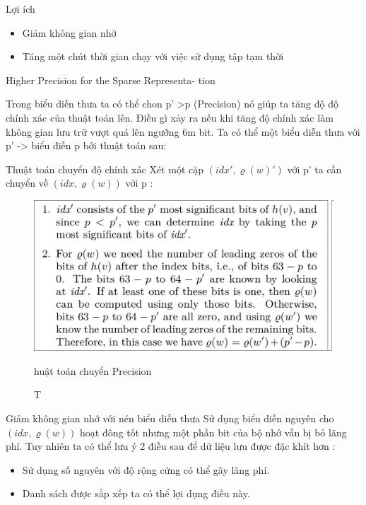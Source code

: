 \documentclass{beamer}
\begin{document}
\begin{frame}{Lợi ích }
\begin{itemize}
\item Giảm không gian nhớ
\item Tăng một chút thời gian chạy với việc sử dụng tập tạm thời
\end{itemize}
\end{frame}
\begin{frame}{Higher Precision for the Sparse Representa-
tion} 

Trong biểu diễn thưa ta có thể chon p' >p (Precision) nó giúp ta tăng độ  độ chính xác của thuật toán lên.
Điều gì xảy ra nếu khi tăng độ chính xác làm không gian lưu trữ vượt quá lên ngưỡng 6m bit.
Ta có thể một biểu diễn thưa với p' -> biểu điễn p bới thuật toán sau:

\end{frame}
\begin{frame}{Thuật toán chuyển độ chính xác}
Xét một cặp $(idx',\varrho(w)') $ với p' ta cần chuyển về $(idx,\varrho(w)) $ với p : 
\begin{figure}[H]
\includegraphics[scale=0.2]{HSR.png}
\caption Thuật toán chuyển Precision
\end{figure}

\end{frame}
\begin{frame}{Giảm không gian nhớ với nén biểu diễn thưa }
Sử dụng biểu diễn nguyên cho $(idx,\varrho(w)) $ hoạt đông tốt nhưng một phần bit của bộ nhớ vẫn bị bỏ lãng phí.
Tuy nhiên ta có thể lưu ý 2 điều sau để dữ liệu lưu được đặc khít hơn :
\begin{itemize}
\item Sử dụng số nguyên với độ rộng cứng có thể gây lãng phí.
\item Danh sách được sắp xếp ta có thể lợi dụng điều này.
\end{itemize}
\end{frame}
\end{document}
